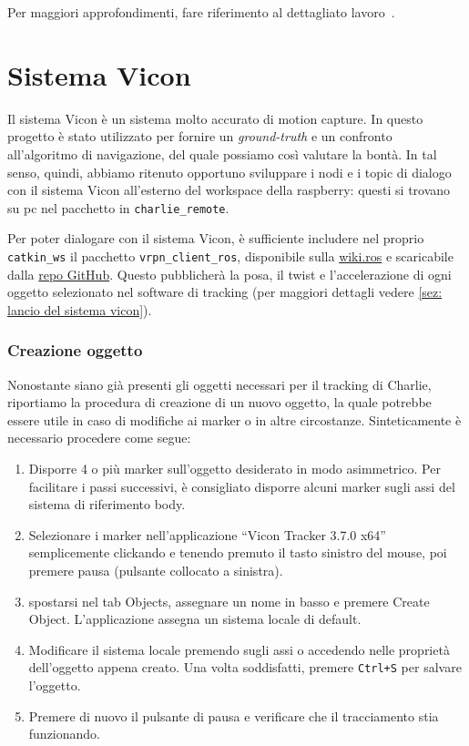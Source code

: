 Per maggiori approfondimenti, fare riferimento al dettagliato lavoro~\cite{ctesconistudio}.

\section{Sistema Vicon}
\label{sez:Sistema Vicon}

Il sistema Vicon è un sistema molto accurato di motion capture. 
In questo progetto è stato utilizzato per fornire un \textit{ground-truth} e un confronto all'algoritmo di navigazione, del quale possiamo così valutare la bontà. 
In tal senso, quindi, abbiamo ritenuto opportuno sviluppare i nodi e i topic di dialogo con il sistema Vicon all'esterno del workspace della raspberry: questi si trovano su pc nel pacchetto in \texttt{charlie\_remote}.

Per poter dialogare con il sistema Vicon, è sufficiente includere nel proprio \texttt{catkin\_ws} il pacchetto \texttt{vrpn\_client\_ros}, disponibile sulla 
\href{https://wiki.ros.org/vrpn_client_ros}{wiki.ros} e scaricabile dalla \href{https://github.com/ros-drivers/vrpn_client_ros}{repo GitHub}.
Questo pubblicherà la posa, il twist e l'accelerazione di ogni oggetto selezionato nel software di tracking (per maggiori dettagli vedere \ref{sez: lancio del sistema vicon}).

\subsubsection{Creazione oggetto}
\label{sez:Sistema Vicon_oggetto}
Nonostante siano già presenti gli oggetti necessari per il tracking di Charlie, riportiamo la procedura di creazione di un nuovo oggetto, la quale potrebbe essere
utile in caso di modifiche ai marker o in altre circostanze. 
Sinteticamente è necessario procedere come segue:
\begin{enumerate}
	\item Disporre 4 o più marker sull'oggetto desiderato in modo asimmetrico. Per facilitare i passi successivi, è consigliato disporre alcuni marker sugli assi 
	del sistema di riferimento body.
	
	\item Selezionare i marker nell'applicazione ``Vicon Tracker 3.7.0 x64'' semplicemente clickando e tenendo premuto il tasto sinistro del mouse, poi premere 
	pausa (pulsante collocato a sinistra).
	
	\item spostarsi nel tab Objects, assegnare un nome in basso e premere Create Object. L'applicazione assegna un sistema locale di default.
	
	\item Modificare il sistema locale premendo sugli assi o accedendo nelle proprietà dell'oggetto appena creato. Una volta soddisfatti, premere \texttt{Ctrl+S} per salvare l'oggetto.
	
	\item Premere di nuovo il pulsante di pausa e verificare che il tracciamento stia funzionando.
\end{enumerate}
           
